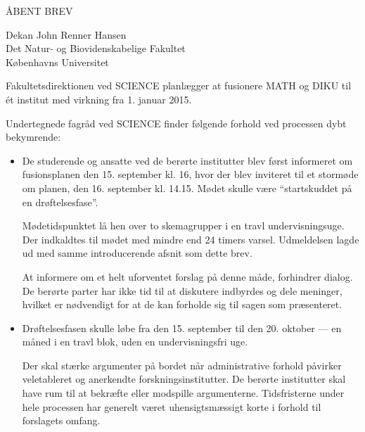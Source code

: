 \documentclass[a4paper]{article}
\begin{document}
ÅBENT BREV

Dekan John Renner Hansen \\
Det Natur- og Biovidenskabelige Fakultet \\
Københavns Universitet

Fakultetsdirektionen ved SCIENCE planlægger at fusionere MATH og DIKU til ét
institut med virkning fra 1. januar 2015.

Undertegnede fagråd ved \mbox{SCIENCE} finder følgende forhold ved processen
dybt bekymrende:

\begin{itemize}

\item De studerende og ansatte ved de berørte institutter blev først informeret
om fusionsplanen den 15. september kl. 16, hvor der blev inviteret til et stormøde
om planen, den 16. september kl. 14.15. Mødet skulle være ``startskuddet på en
drøftelsesfase''\cite{invite}.

Mødetidspunktet lå hen over to skemagrupper i en travl undervisningsuge.  Der
indkaldtes til mødet med mindre end 24 timers varsel. Udmeldelsen lagde ud med
samme introducerende afsnit som dette brev.

At informere om et helt uforventet forslag på denne måde, forhindrer dialog. De
berørte parter har ikke tid til at diskutere indbyrdes og dele meninger,
hvilket er nødvendigt for at de kan forholde sig til sagen som præsenteret.

\item Drøftelsesfasen skulle løbe fra den 15. september til den 20. oktober ---
en måned i en travl blok, uden en undervisningsfri uge.




Der skal stærke argumenter på bordet når administrative forhold påvirker
veletableret og anerkendte forskningsinstitutter. De berørte institutter skal
have rum til at bekræfte eller modspille argumenterne.  Tidsfristerne under
hele processen har generelt været uhensigtsmæssigt korte i forhold til
forslagets omfang.


\end{itemize}
\end{document}

